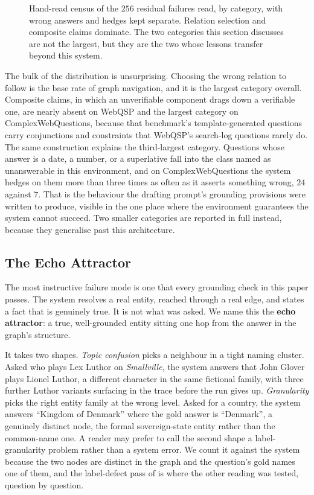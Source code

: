 \begin{figure}[!tb]
  \begin{center}
    
  \end{center}
  \caption{Hand-read census of the $256$ residual failures read, by
    category, with wrong answers and hedges kept separate. Relation
    selection and composite claims dominate. The two categories this
    section discusses are not the largest, but they are the two whose
    lessons transfer beyond this system.}
  \label{fig:failures}
\end{figure}

The bulk of the distribution is unsurprising. Choosing the wrong
relation to follow is the base rate of graph navigation, and it is the
largest category overall. Composite claims, in which an unverifiable
component drags down a verifiable one, are nearly absent on WebQSP and
the largest category on ComplexWebQuestions, because that benchmark's
template-generated questions carry conjunctions and constraints that
WebQSP's search-log questions rarely do. The same construction explains
the third-largest category. Questions whose answer is a date, a number,
or a superlative fall into the class  named as
unanswerable in this environment, and on ComplexWebQuestions the system
hedges on them more than three times as often as it asserts something
wrong, $24$ against $7$. That is the behaviour the drafting prompt's
grounding provisions were written to produce, visible in the one place
where the environment guarantees the system cannot succeed. Two smaller
categories are reported in full instead, because they generalise past
this architecture.

\subsection{The Echo Attractor}\label{sec:echo}

The most instructive failure mode is one that every grounding check in
this paper passes. The system resolves a real entity, reached through a
real edge, and states a fact that is genuinely true. It is not what was
asked. We name this the \textbf{echo attractor}: a true, well-grounded
entity sitting one hop from the answer in the graph's structure.

It takes two shapes. \emph{Topic confusion} picks a neighbour in a tight
naming cluster. Asked who plays Lex Luthor on \emph{Smallville}, the
system answers that John Glover plays Lionel Luthor, a different
character in the same fictional family, with three further Luthor
variants surfacing in the trace before the run gives up.
\emph{Granularity} picks the right entity family at the wrong level.
Asked for a country, the system answers ``Kingdom of Denmark'' where the
gold answer is ``Denmark'', a genuinely distinct node, the formal
sovereign-state entity rather than the common-name one. A reader may
prefer to call the second shape a label-granularity problem rather than
a system error. We count it against the system because the two nodes are
distinct in the graph and the question's gold names one of them, and the
label-defect pass of  is where the other reading was
tested, question by question.

